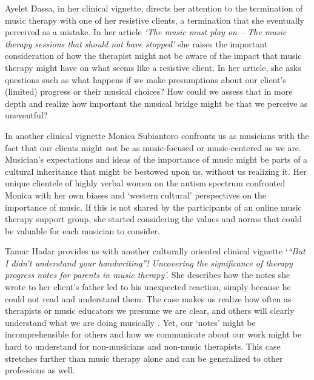 \documentclass[authordate, empirical, issue]{jote-new-article}
\begin{document}
Ayelet Dassa, in her clinical vignette, directs her attention to the termination of music therapy with one of her resistive clients, a termination that she eventually perceived as a mistake. In her article \emph{‘The music must play on -- The music therapy sessions that should not have stopped' }she raises the important consideration of how the therapist might not be aware of the impact that music therapy might have on what seems like a resistive client. In her article, she asks questions such as what happens if we make presumptions about our client's (limited) progress or their musical choices? How could we assess that in more depth and realize how important the musical bridge might be that we perceive as uneventful?


\newpage

In another clinical vignette Monica Subiantoro confronts us as musicians with the fact that our clients might not be as music-focused or music-centered as we are. Musician's expectations and ideas of the importance of music might be parts of a cultural inheritance that might be bestowed upon us, without us realizing it. Her unique clientele of highly verbal women on the autism spectrum confronted Monica with her own biases and ‘western cultural' perspectives on the importance of music. If this is not shared by the participants of an online music therapy support group, she started considering the values and norms that could be valuable for each musician to consider.



Tamar Hadar provides us with another culturally oriented clinical vignette ‘\emph{“But I didn't understand your handwriting”! Uncovering the significance of therapy progress notes for parents in music therapy'.} She describes how the notes she wrote to her client's father led to his unexpected reaction, simply because he could not read and understand them. The case makes us realize how often as therapists or music educators we presume we are clear, and others will clearly understand what we are doing musically . Yet, our ‘notes' might be incomprehensible for others and how we communicate about our work might be hard to understand for non-musicians and non-music therapists. This case stretches further than music therapy alone and can be generalized to other professions as well.
\end{document}
